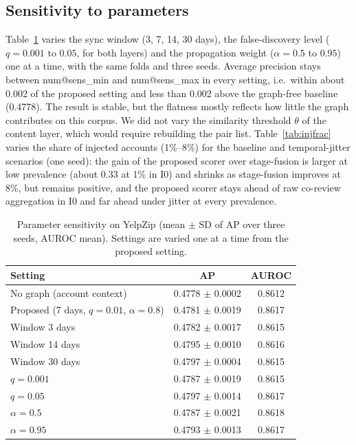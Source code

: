 \documentclass[pdflatex,sn-basic]{sn-jnl}
\makeatletter
\theoremstyle{thmstyleone}
\theoremstyle{thmstylethree}
\newcommand{\num}[1]{\csname num@#1\endcsname}
\makeatother
\begin{document}
\subsection{Sensitivity to parameters}\label{sec:res_sens_real}
Table~\ref{tab:sens} varies the sync window (3, 7, 14, 30 days), the false-discovery level ($q=0.001$ to $0.05$, for both layers) and the propagation weight ($\alpha=0.5$ to $0.95$) one at a time, with the same folds and three seeds. Average precision stays between \num{sens_min} and \num{sens_max} in every setting, i.e.\ within about 0.002 of the proposed setting and less than 0.002 above the graph-free baseline (0.4778). The result is stable, but the flatness mostly reflects how little the graph contributes on this corpus. We did not vary the similarity threshold $\theta$ of the content layer, which would require rebuilding the pair list. Table~\ref{tab:injfrac} varies the share of injected accounts (1\%--8\%) for the baseline and temporal-jitter scenarios (one seed): the gain of the proposed scorer over stage-fusion is larger at low prevalence (about 0.33 at 1\% in I0) and shrinks as stage-fusion improves at 8\%, but remains positive, and the proposed scorer stays ahead of raw co-review aggregation in I0 and far ahead under jitter at every prevalence.

\begin{table}[t]
\caption{Parameter sensitivity on YelpZip (mean $\pm$ SD of AP over three seeds, AUROC mean). Settings are varied one at a time from the proposed setting.}\label{tab:sens}
\small\setlength{\tabcolsep}{3pt}
\begin{tabular}{@{}lcc@{}}
\toprule
Setting & AP & AUROC \\
\midrule
No graph (account context) & 0.4778 $\pm$ 0.0002 & 0.8612 \\
Proposed (7 days, $q=0.01$, $\alpha=0.8$) & 0.4781 $\pm$ 0.0019 & 0.8617 \\
Window 3 days & 0.4782 $\pm$ 0.0017 & 0.8615 \\
Window 14 days & 0.4795 $\pm$ 0.0010 & 0.8616 \\
Window 30 days & 0.4797 $\pm$ 0.0004 & 0.8615 \\
$q=0.001$ & 0.4787 $\pm$ 0.0019 & 0.8615 \\
$q=0.05$ & 0.4797 $\pm$ 0.0014 & 0.8617 \\
$\alpha=0.5$ & 0.4787 $\pm$ 0.0021 & 0.8618 \\
$\alpha=0.95$ & 0.4793 $\pm$ 0.0013 & 0.8617 \\
\bottomrule
\end{tabular}
\end{table}
\end{document}
